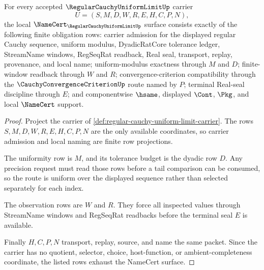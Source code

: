 \begin{theorem}
\label{thm:regular-cauchy-uniform-limit-namecert-obligations}
For every accepted $\RegularCauchyUniformLimitUp$ carrier
$$
U=(S,M,D,W,R,E,H,C,P,N),
$$
the local $\NameCert_{\RegularCauchyUniformLimitUp}$ surface consists exactly of the following finite obligation rows: carrier admission for the displayed regular Cauchy sequence, uniform modulus, DyadicRatCore tolerance ledger, StreamName windows, RegSeqRat readback, Real seal, transport, replay, provenance, and local name; uniform-modulus exactness through $M$ and $D$; finite-window readback through $W$ and $R$; convergence-criterion compatibility through the $\CauchyConvergenceCriterionUp$ route named by $P$; terminal Real-seal discipline through $E$; and componentwise $\hsame$, displayed $\Cont$, $\Pkg$, and local $\NameCert$ support.
\end{theorem}
\begin{proof}
Project the carrier of \autoref{def:regular-cauchy-uniform-limit-carrier}. The rows $S,M,D,W,R,E,H,C,P,N$ are the only available coordinates, so carrier admission and local naming are finite row projections.

The uniformity row is $M$, and its tolerance budget is the dyadic row $D$. Any precision request must read those rows before a tail comparison can be consumed, so the route is uniform over the displayed sequence rather than selected separately for each index.

The observation rows are $W$ and $R$. They force all inspected values through StreamName windows and RegSeqRat readbacks before the terminal seal $E$ is available.

Finally $H,C,P,N$ transport, replay, source, and name the same packet. Since the carrier has no quotient, selector, choice, host-function, or ambient-completeness coordinate, the listed rows exhaust the NameCert surface.
\end{proof}


